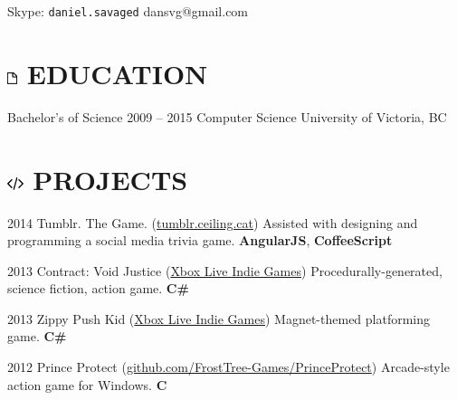 \documentclass[10pt]{tccv}
\begin{document}
    {Skype: \texttt{daniel.savaged}}
    {dansvg@gmail.com}

\section{\includegraphics[height=10pt, keepaspectratio=true]{file} EDUCATION}

\begin{yearlist}

\item[Bachelor's of Science]{2009 -- 2015}
     {Computer Science}
     {University of Victoria, BC}

\end{yearlist}

\section{\includegraphics[height=10pt, keepaspectratio=true]{code} PROJECTS}

\begin{yearlist}

\item{2014}
     {Tumblr. The Game. (\href{http://tumblr.ceiling.cat/}{tumblr.ceiling.cat})}
     {Assisted with designing and programming a social media trivia game. \textbf{AngularJS}, \textbf{CoffeeScript}}

\item{2013}
     {Contract: Void Justice (\href{http://marketplace.xbox.com/en-US/Product/Contract-Void-Justice/66acd000-77fe-1000-9115-d80258550d94}{Xbox Live Indie Games})}
     {Procedurally-generated, science fiction, action game. \textbf{C\#}}

\item{2013}
     {Zippy Push Kid (\href{http://marketplace.xbox.com/en-ca/Product/Zippy-Push-Kid/66acd000-77fe-1000-9115-d80258550cd6}{Xbox Live Indie Games})}
     {Magnet-themed platforming game. \textbf{C\#}}

\item{2012}
     {Prince Protect (\href{https://github.com/FrostTree-Games/PrinceProtect}{github.com/FrostTree-Games/PrinceProtect})}
     {Arcade-style action game for Windows. \textbf{C}}

\end{yearlist}
\end{document}
